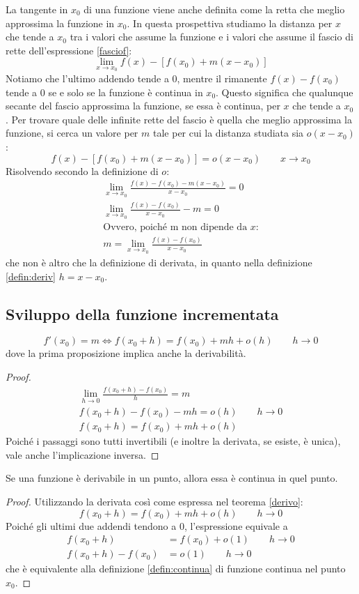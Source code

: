 La tangente in $x_0$ di una funzione viene anche definita come la retta che meglio approssima la funzione in $x_0$. In questa prospettiva studiamo la distanza per $x$ che tende a $x_0$ tra i valori che assume la funzione e i valori che assume il fascio di rette dell'espressione \ref{fasciof}:
\[
	\lim_{x\to x_0} f(x)-[f(x_0)+m(x-x_0)]
\]
Notiamo che l'ultimo addendo tende a $0$, mentre il rimanente $f(x)-f(x_0)$ tende a $0$ se e solo se la funzione è continua in $x_0$. Questo significa che qualunque secante del fascio approssima la funzione, se essa è continua, per $x$ che tende a $x_0$. Per trovare quale delle infinite rette del fascio è quella che meglio approssima la funzione, si cerca un valore per $m$ tale per cui la distanza studiata sia $o(x-x_0)$:
\[
	f(x)-[f(x_0)+m(x-x_0)]=o(x-x_0)\qquad x\to x_0
\]
Risolvendo secondo la definizione di $o$:
\begin{gather*}
	\lim_{x\to x_0}\frac{f(x)-f(x_0)-m(x-x_0)}{x-x_0}=0\\
	\lim_{x\to x_0}\frac{f(x)-f(x_0)}{x-x_0}-m=0\\
	\text{Ovvero, poiché m non dipende da $x$:}\\
	m=\lim_{x\to x_0} \frac{f(x)-f(x_0)}{x-x_0}
\end{gather*}
che non è altro che la definizione di derivata, in quanto nella definizione \ref{defin:deriv} $h=x-x_0$.


\subsection{Sviluppo della funzione incrementata}
\begin{teor}
	\label{derivo}
	\[
		f'(x_0)=m \iff f(x_0+h)=f(x_0)+mh+o(h)\qquad h\to0
	\]
	dove la prima proposizione implica anche la derivabilità.
\end{teor}
\begin{proof}
	\begin{gather*}
		\lim_{h\to0} \frac{f(x_0+h)-f(x_0)}{h}=m\\
		f(x_0+h)-f(x_0)-mh=o(h)\qquad h\to0\\
		f(x_0+h)=f(x_0)+mh+o(h)
	\end{gather*}
	Poiché i passaggi sono tutti invertibili (e inoltre la derivata, se esiste, è unica), vale anche l'implicazione inversa.
\end{proof}

\begin{corol}
	Se una funzione è derivabile in un punto, allora essa è continua in quel punto.
\end{corol}
\begin{proof}
	Utilizzando la derivata così come espressa nel teorema \ref{derivo}:
	\[
		f(x_0+h)=f(x_0)+mh+o(h)\qquad h\to0
	\]
	Poiché gli ultimi due addendi tendono a $0$, l'espressione equivale a
	\begin{align*}
		f(x_0+h)          & = f(x_0)+o(1)\qquad h\to0 \\
		f(x_0+h) - f(x_0) & = o(1)\qquad h\to0
	\end{align*}
	che è equivalente alla definizione \vref{defin:continua} di funzione continua nel punto $x_0$.
\end{proof}



